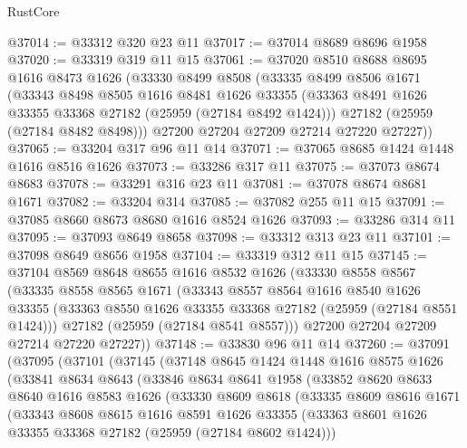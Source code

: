 \begin{lexlean}{RustCore}
\begin{coremodule}
@37014 := @33312 @320 @23 @11
@37017 := @37014 @8689 @8696 @1958
@37020 := @33319 @319 @11 @15
@37061 := @37020
    @8510
    @8688
    @8695
    @1616
    @8473
    @1626
    (@33330
      @8499
      @8508
      (@33335
        @8499
        @8506
        @1671
        (@33343
          @8498
          @8505
          @1616
          @8481
          @1626
          @33355
          (@33363 @8491 @1626 @33355 @33368 @27182 (@25959 (@27184 @8492 @1424)))
          @27182
          (@25959 (@27184 @8482 @8498)))
        @27200
        @27204
        @27209
        @27214
        @27220
        @27227))
@37065 := @33204 @317 @96 @11 @14
@37071 := @37065 @8685 @1424 @1448 @1616 @8516 @1626
@37073 := @33286 @317 @11
@37075 := @37073 @8674 @8683
@37078 := @33291 @316 @23 @11
@37081 := @37078 @8674 @8681 @1671
@37082 := @33204 @314
@37085 := @37082 @255 @11 @15
@37091 := @37085 @8660 @8673 @8680 @1616 @8524 @1626
@37093 := @33286 @314 @11
@37095 := @37093 @8649 @8658
@37098 := @33312 @313 @23 @11
@37101 := @37098 @8649 @8656 @1958
@37104 := @33319 @312 @11 @15
@37145 := @37104
    @8569
    @8648
    @8655
    @1616
    @8532
    @1626
    (@33330
      @8558
      @8567
      (@33335
        @8558
        @8565
        @1671
        (@33343
          @8557
          @8564
          @1616
          @8540
          @1626
          @33355
          (@33363 @8550 @1626 @33355 @33368 @27182 (@25959 (@27184 @8551 @1424)))
          @27182
          (@25959 (@27184 @8541 @8557)))
        @27200
        @27204
        @27209
        @27214
        @27220
        @27227))
@37148 := @33830 @96 @11 @14
@37260 := @37091
    (@37095
      (@37101
        (@37145
          (@37148
            @8645
            @1424
            @1448
            @1616
            @8575
            @1626
            (@33841
              @8634
              @8643
              (@33846
                @8634
                @8641
                @1958
                (@33852
                  @8620
                  @8633
                  @8640
                  @1616
                  @8583
                  @1626
                  (@33330
                    @8609
                    @8618
                    (@33335
                      @8609
                      @8616
                      @1671
                      (@33343
                        @8608
                        @8615
                        @1616
                        @8591
                        @1626
                        @33355
                        (@33363 @8601 @1626 @33355 @33368 @27182 (@25959 (@27184 @8602 @1424)))

\end{coremodule}
\end{lexlean}
